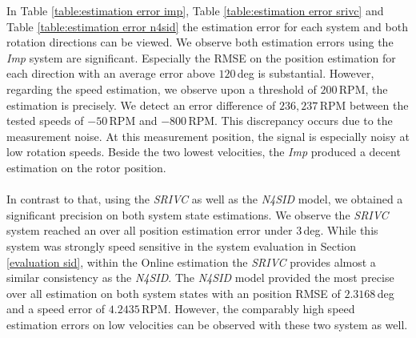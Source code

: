 \documentclass[english]{isasthesis}
\begin{document}
  			In Table \ref{table:estimation error imp}, Table \ref{table:estimation error srivc} and Table \ref{table:estimation error n4sid} the estimation error for each system and both rotation directions can be viewed. We observe both estimation errors using the \textit{Imp} system are significant. Especially the RMSE on the position estimation for each direction with an average error above $120\,$deg is substantial. However, regarding the speed estimation, we observe upon a threshold of $200\,$RPM, the estimation is precisely. We detect an error difference of $236,237\,$RPM between the tested speeds of $-50\,$RPM and $-800\,$RPM. This discrepancy occurs due to the measurement noise. At this measurement position, the signal is especially noisy at low rotation speeds. Beside the two lowest velocities, the \textit{Imp} produced a decent estimation on the rotor position. \\\\
  			In contrast to that, using the \textit{SRIVC} as well as the \textit{N4SID} model, we obtained a significant precision on both system state estimations. We observe the \textit{SRIVC} system reached an over all position estimation error under $3\,$deg. While this system was strongly speed sensitive in the system evaluation in Section \ref{evaluation sid}, within the Online estimation the \textit{SRIVC} provides almost a similar consistency as the \textit{N4SID}. The \textit{N4SID} model provided the most precise over all estimation on both system states with an position RMSE of $2.3168\,$deg and a speed error of $4.2435\,$RPM. However, the comparably high speed estimation errors on low velocities can be observed with these two system as well.  
 	
\end{document}
